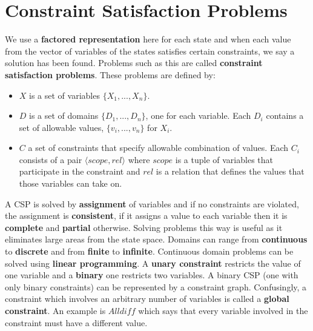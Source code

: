 \documentclass[twoside]{article}
\begin{document}
\section{Constraint Satisfaction Problems}
We use a \textbf{factored representation} here for each state and when each 
value from the vector of variables of the states satisfies certain constraints,
we say a solution has been found. Problems such as this are called \textbf{constraint
satisfaction problems}. These problems are defined by:
\begin{itemize}
        \item \(X\) is a set of variables \(\{X_1, ... , X_n\}\).
        \item \(D\) is a set of domains \(\{D_1, ... , D_n\}\), one for each
        variable. Each \(D_i\) contains a set of allowable values,
        \(\{v_i,...,v_n\}\) for \(X_i\).
        \item \(C\) a set of constraints that specify allowable combination of
        values. Each \(C_i\) consists of a pair \(\langle scope, rel\rangle\)
        where \(scope\) is a tuple of variables that participate in the 
        constraint and \(rel\) is a relation that defines the values that 
        those variables can take on.
\end{itemize}
A CSP is solved by \textbf{assignment} of variables and if no constraints are 
violated, the assignment is \textbf{consistent}, if it assigns a value to each
variable then it is \textbf{complete} and \textbf{partial} otherwise. Solving
problems this way is useful as it eliminates large areas from the state space.
Domains can range from \textbf{continuous} to \textbf{discrete} and from
\textbf{finite} to \textbf{infinite}. Continuous domain problems can be 
solved using \textbf{linear programming}. A \textbf{unary constraint} restricts 
the value of one variable and a \textbf{binary} one restricts two variables. A
binary CSP (one with only binary constraints) can be represented by a constraint
graph. Confusingly, a constraint which involves an arbitrary number of variables
is called a \textbf{global constraint}. An example is \(Alldiff\) which says
that every variable involved in the constraint must have a different value. \\
\end{document}
